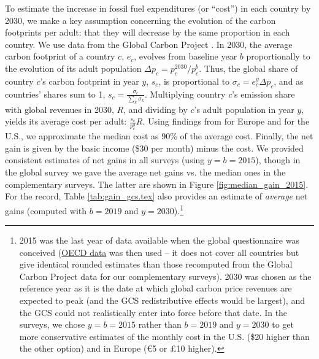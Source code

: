 To estimate the increase in fossil fuel expenditures (or ``cost'') in each country by 2030, we make a key assumption concerning the evolution of the carbon footprints per adult: that they will decrease by the same proportion in each country. We use data from the Global Carbon Project \citep{peters_synthesis_2012}. In 2030, the average carbon footprint of a country $c$, $e_c$, evolves from baseline year $b$ proportionally to the evolution of its adult population $\Delta p_c = p^{2030}_c/p^b_c$. Thus, the global share of country $c$'s carbon footprint in year $y$, $s_c$, is proportional to $\sigma_c = e^y_c \Delta p_c$, and as countries' shares sum to 1, $s_c = \frac{\sigma_c}{\sum_k \sigma_k}$. Multiplying country $c$'s emission share with global revenues in 2030, $R$, and dividing by $c$'s adult population in year $y$, yields its average cost per adult: $\frac{s_c}{p^y_c} R$. Using findings from \citet{ivanova_unequal_2020} for Europe and \citet{fremstad_impact_2019} for the U.S., we approximate the median cost as 90\% of the average cost. Finally, the net gain is given by the basic income (\$30 per month) minus the cost. We provided consistent estimates of net gains in all surveys (using $y = b = 2015$), though in the global survey we gave the average net gains vs. the median ones in the complementary surveys. The latter are shown in Figure \ref{fig:median_gain_2015}. 
For the record, Table \ref{tab:gain_gcs.tex} also provides an estimate of \textit{average} net gains (computed with $b = 2019$ and $y = 2030$).\footnote{2015 was the last year of data available when the global questionnaire was conceived (\href{https://stats.oecd.org/Index.aspx?DataSetCode=IO_GHG_2019}{OECD data} was then used -- it does not cover all countries but give identical rounded estimates than those recomputed from the Global Carbon Project data for our complementary surveys). 2030 was chosen as the reference year as it is the date at which global carbon price revenues are expected to peak (and the GCS redistributive effects would be largest), and the GCS could not realistically enter into force before that date. In the surveys, we chose $y = b = 2015$ rather than $b = 2019$ and $y = 2030$ to get more conservative estimates of the monthly cost in the U.S. (\$20 higher than the other option) and in Europe (\euro{5} or £10 higher).}%

